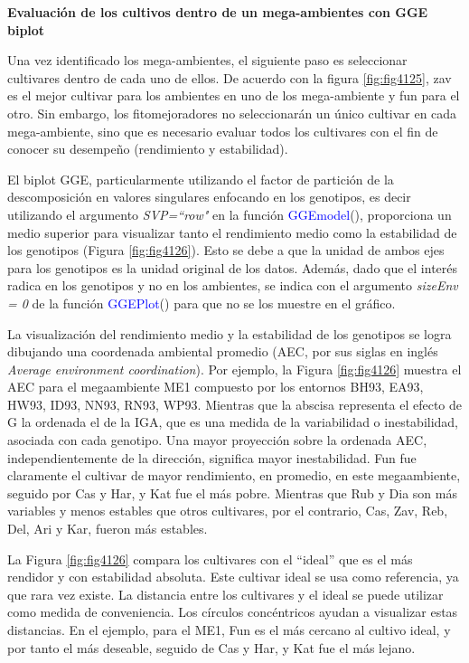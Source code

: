 \textbf{Evaluación de los cultivos dentro de un mega-ambientes con GGE biplot}

Una vez identificado los mega-ambientes, el siguiente paso es seleccionar cultivares dentro de cada uno de ellos. De acuerdo con la figura  \ref{fig:fig4125}, zav es el mejor cultivar para los ambientes en uno de los mega-ambiente y fun para el otro. Sin embargo, los fitomejoradores no seleccionarán un único cultivar en cada mega-ambiente, sino que es necesario evaluar todos los cultivares con el fin de conocer su desempeño (rendimiento y estabilidad).  

El biplot GGE, particularmente utilizando el factor de partición de la descomposición en valores singulares enfocando en los genotipos, es decir utilizando el argumento \emph{SVP=``row"} en la función \textcolor{blue}{GGEmodel}(), proporciona un medio superior para visualizar tanto el rendimiento medio como la estabilidad de los genotipos (Figura \ref{fig:fig4126}). Esto se debe a que la unidad de ambos ejes para los genotipos es la unidad original de los datos. Además, dado que el interés radica en los genotipos y no en los ambientes, se indica con el argumento \emph{sizeEnv = 0} de la función \textcolor{blue}{GGEPlot}() para que no se los muestre en el gráfico.


La visualización del rendimiento medio y la estabilidad de los genotipos se logra dibujando una coordenada ambiental promedio (AEC, por sus siglas en inglés \emph{Average environment coordination}). Por ejemplo, la Figura \ref{fig:fig4126}  muestra el AEC para el megaambiente ME1 compuesto por los entornos BH93, EA93, HW93, ID93, NN93, RN93, WP93. Mientras que la abscisa representa el efecto de G la ordenada el de la IGA, que es una medida de la variabilidad o inestabilidad, asociada con cada genotipo. Una mayor proyección sobre la ordenada AEC, independientemente de la dirección, significa mayor inestabilidad. Fun fue claramente el cultivar de mayor rendimiento, en promedio, en este megaambiente, seguido por Cas y Har, y Kat fue el más pobre. Mientras que Rub y Dia son más variables y menos estables que otros cultivares, por el contrario, Cas, Zav, Reb, Del, Ari y Kar, fueron más estables. 

La Figura \ref{fig:fig4126} compara los cultivares con el ``ideal” que es el más rendidor y con estabilidad absoluta. Este cultivar ideal se usa como referencia, ya que rara vez existe. La distancia entre los cultivares y el ideal se puede utilizar como medida de conveniencia. Los círculos concéntricos ayudan a visualizar estas distancias. En el ejemplo, para el ME1, Fun es el más cercano al cultivo ideal, y por tanto el más deseable, seguido de Cas y Har, y Kat fue el más lejano. \\

